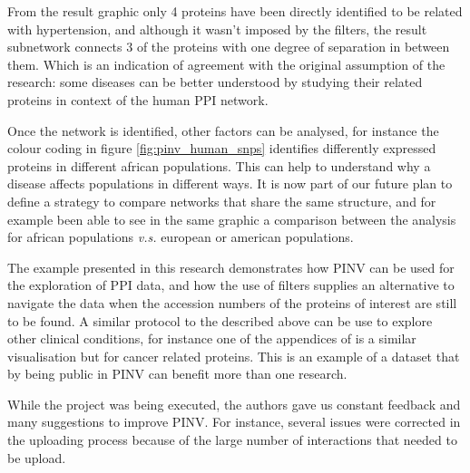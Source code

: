 From the result graphic only 4 proteins have been directly identified to be related with hypertension, and although it wasn't  imposed by the filters, the result subnetwork connects 3 of the proteins with one degree of separation in between them. Which is an indication of agreement with the original assumption of the research: some diseases can be better understood by studying their related proteins in context of the human PPI network.

Once the network is identified, other factors can be analysed, for instance the colour coding in figure \ref{fig:pinv_human_snps} identifies differently expressed proteins in different african populations. This can help to understand why a disease affects populations in different ways. It is now part of our future plan to define a strategy to compare networks that share the same structure, and for example been able to see in the same graphic a comparison between the analysis for african populations \emph{v.s.} european or american populations. 

The example presented in this research demonstrates how PINV can be used for the exploration of PPI data, and how the use of filters supplies an alternative to navigate the data when the accession numbers of the proteins of interest are still to be found. A similar protocol to the described above can be use to explore other clinical conditions, for instance one of the appendices of \cite{HEE2014} is a similar visualisation but for cancer related proteins. This is an example of a dataset that by being public in PINV can benefit more than one research.

While the project was being executed, the authors gave us constant feedback and many suggestions to improve PINV. For instance, several issues were corrected in the uploading process because of the large number of interactions that needed to be upload.



